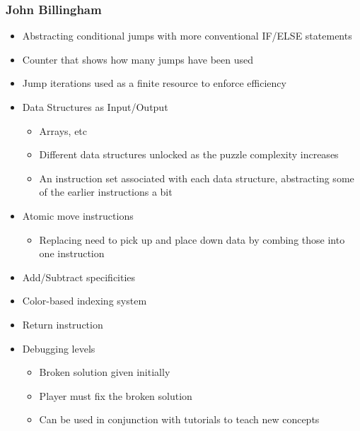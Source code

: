 \documentclass{article}
\begin{document}
\subsubsection{John Billingham}
\begin{itemize}
  \item Abstracting conditional jumps with more conventional IF/ELSE statements
  \item Counter that shows how many jumps have been used
  \item Jump iterations used as a finite resource to enforce efficiency
  \item Data Structures as Input/Output
  \begin{itemize}
    \item Arrays, etc
    \item Different data structures unlocked as the puzzle complexity increases
    \item An instruction set associated with each data structure, abstracting
    some of the earlier instructions a bit
  \end{itemize}
  \item Atomic move instructions
  \begin{itemize}
    \item Replacing need to pick up and place down data by combing those into
    one instruction
  \end{itemize}
  \item Add/Subtract specificities
  \item Color-based indexing system
  \item Return instruction
  \item Debugging levels
  \begin{itemize}
    \item Broken solution given initially
    \item Player must fix the broken solution
    \item Can be used in conjunction with tutorials to teach new concepts
  \end{itemize}
\end{itemize}
\end{document}
